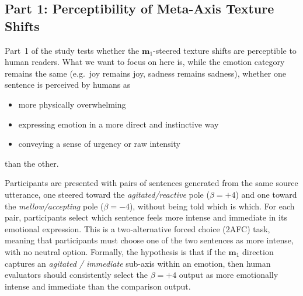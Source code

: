 
\subsection{Part 1: Perceptibility of Meta-Axis Texture Shifts}

Part~1 of the study tests whether the $\mathbf{m}_1$-steered texture shifts are perceptible to human readers. What we want to focus on here is, while the emotion category remains the same (e.g.\ joy remains joy, sadness remains sadness), whether one sentence is perceived by humans as
\begin{itemize}
    \item more physically overwhelming
    \item expressing emotion in a more direct and instinctive way
    \item conveying a sense of urgency or raw intensity
\end{itemize}
than the other.\par

Participants are presented with pairs of sentences generated from the same source utterance, one steered toward the \textit{agitated/reactive} pole ($\beta = +4$) and one toward the \textit{mellow/accepting} pole ($\beta = -4$), without being told which is which. For each pair, participants select which sentence feels more intense and immediate in its emotional expression. This is a two-alternative forced choice (2AFC) task, meaning that participants must choose one of the two sentences as more intense, with no neutral option. Formally, the hypothesis is that if the $\mathbf{m}_1$ direction captures an \textit{agitated / immediate} sub-axis within an emotion, then human evaluators should consistently select the $\beta=+4$ output as more emotionally intense and immediate than the comparison output.\par

